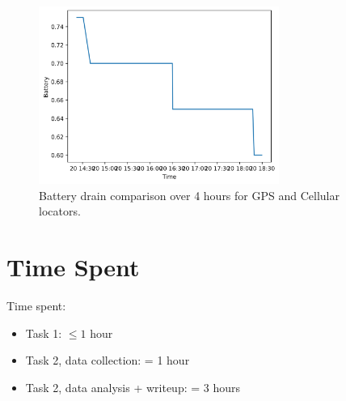 \documentclass{lab}
\begin{document}
\begin{figure}[h!]
    \centering
    \includegraphics[width=0.7\textwidth]{images/battery_over_time_cellular.png}
    \caption{Battery drain comparison over 4 hours for GPS and Cellular locators.}
    \label{fig:battery_drain_xellular}
\end{figure}

\section{Time Spent} 

Time spent:

\begin{itemize}
  \item Task 1: $\leq 1$ hour
  \item Task 2, data collection: = 1 hour
  \item Task 2, data analysis + writeup: = 3 hours
\end{itemize}
\end{document}
